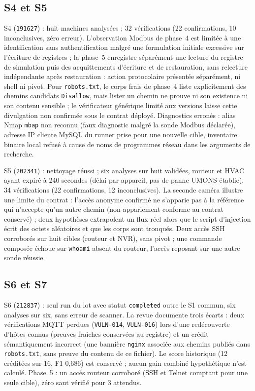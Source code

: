 \documentclass[11pt,a4paper]{article}
\newcommand{\code}[1]{{\urlstyle{tt}\nolinkurl{#1}}}
\begin{document}
\subsection{S4 et S5}
S4 (\code{191627}) : huit machines analys\'ees ; 32 v\'erifications (22 confirmations, 10 inconclusives, z\'ero erreur). L'observation Modbus de phase~4 est limit\'ee \`a une identification sans authentification malgr\'e une formulation initiale excessive sur l'\'ecriture de registres ; la phase~5 enregistre s\'epar\'ement une lecture du registre de simulation puis des acquittements d'\'ecriture et de restauration, sans relecture ind\'ependante apr\`es restauration : action protocolaire pr\'esent\'ee s\'epar\'ement, ni shell ni pivot. Pour \code{robots.txt}, le corps frais de phase~4 liste explicitement des chemins candidats \code{Disallow}, mais lister un chemin ne prouve ni son existence ni son contenu sensible ; le v\'erificateur g\'en\'erique limit\'e aux versions laisse cette divulgation non confirm\'ee sous le contrat d\'eploy\'e. Diagnostics erron\'es : alias Nmap \code{mbap} non reconnu (faux diagnostic malgr\'e la sonde Modbus d\'eclar\'ee), adresse IP cliente MySQL du runner prise pour une nouvelle cible, inventaire binaire local refus\'e \`a cause de noms de programmes r\'eseau dans les arguments de recherche.

S5 (\code{202341}) : nettoyage r\'eussi ; six analyses sur huit valid\'ees, routeur et HVAC ayant expir\'e \`a 240 secondes (d\'elai par appareil, pas de panne UMONS \'etablie). 34 v\'erifications (22 confirmations, 12 inconclusives). La seconde cam\'era illustre une limite du contrat : l'acc\`es anonyme confirm\'e ne s'apparie pas \`a la r\'ef\'erence qui n'accepte qu'un autre chemin (non-appariement conforme au contrat conserv\'e) ; deux hypoth\`eses extrapolent un flux r\'eel alors que le script d'injection \'ecrit des octets al\'eatoires et que les corps sont tronqu\'es. Deux acc\`es SSH corrobor\'es sur huit cibles (routeur et NVR), sans pivot ; une commande compos\'ee \'echoue sur \code{whoami} absent du routeur, l'acc\`es reposant sur une autre sonde r\'eussie.

\subsection{S6 et S7}
S6 (\code{212837}) : seul run du lot avec statut \code{completed} outre le S1 commun, six analyses sur six, sans erreur de scanner. La revue documente trois \'ecarts : deux v\'erifications MQTT perdues (\code{VULN-014}, \code{VULN-016}) lors d'une red\'ecouverte d'h\^otes connus (preuves fra\^iches conserv\'ees au registre) et un cr\'edit s\'emantiquement incorrect (une banni\`ere \code{nginx} associ\'ee aux chemins publi\'es dans \code{robots.txt}, sans preuve du contenu de ce fichier). Le score historique (12 cr\'edit\'ees sur 16, F1 0,686) est conserv\'e ; aucun gain combin\'e hypoth\'etique n'est calcul\'e. Phase~5 : un acc\`es routeur corrobor\'e (SSH et Telnet comptant pour une seule cible), z\'ero saut v\'erifi\'e pour 3 attendus.
\end{document}
